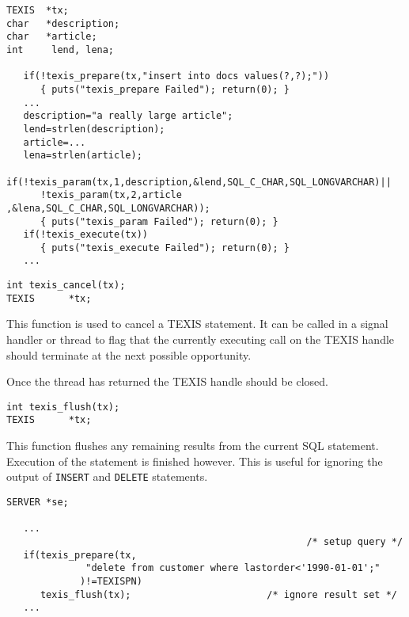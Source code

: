 \EXAMPLE
\begin{verbatim}
TEXIS  *tx;
char   *description;
char   *article;
int     lend, lena;

   if(!texis_prepare(tx,"insert into docs values(?,?);"))
      { puts("texis_prepare Failed"); return(0); }
   ...
   description="a really large article";
   lend=strlen(description);
   article=...
   lena=strlen(article);
   if(!texis_param(tx,1,description,&lend,SQL_C_CHAR,SQL_LONGVARCHAR)||
      !texis_param(tx,2,article    ,&lena,SQL_C_CHAR,SQL_LONGVARCHAR));
      { puts("texis_param Failed"); return(0); }
   if(!texis_execute(tx))
      { puts("texis_execute Failed"); return(0); }
   ...
\end{verbatim}


\SYNOPSIS
\begin{verbatim}
int texis_cancel(tx);
TEXIS      *tx;
\end{verbatim}

\DESCRIPTION

This function is used to cancel a TEXIS statement.  It can be called in a
signal handler or thread to flag that the currently executing call on the
TEXIS handle should terminate at the next possible opportunity.

Once the thread has returned the TEXIS handle should be closed.


\SYNOPSIS
\begin{verbatim}
int texis_flush(tx);
TEXIS      *tx;
\end{verbatim}

\DESCRIPTION

This function flushes any remaining results from the current SQL
statement. Execution of the statement is finished however. This
is useful for ignoring the output of \verb`INSERT` and \verb`DELETE` statements.

\EXAMPLE
\begin{verbatim}
SERVER *se;

   ...
                                                     /* setup query */
   if(texis_prepare(tx,
              "delete from customer where lastorder<'1990-01-01';"
             )!=TEXISPN)
      texis_flush(tx);                        /* ignore result set */
   ...
\end{verbatim}


